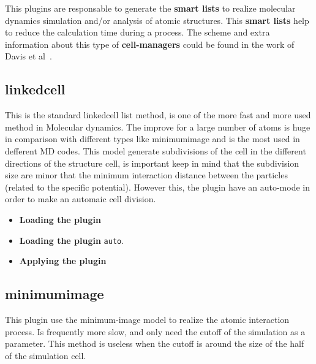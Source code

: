 This plugins are responsable to generate the \textbf{smart lists} to realize
molecular dynamics simulation and/or analysis of atomic structures. This
\textbf{smart lists} help to reduce the calculation time during a process. The
scheme and extra information about this type of \textbf{cell-managers} could be
found in the work of Davis et al~\cite{Davis2010}.

\subsection{linkedcell}
This is the standard linkedcell list method, is one of the more fast and more
used method in Molecular dynamics. The improve for a large number of atoms is
huge in comparison with different types like minimumimage and is the most used
in defferent MD codes. This model generate subdivisions of the cell in the
different directions of the structure cell, is important keep in mind that the
subdivision size are minor that the minimum interaction distance between the
particles (related to the specific potential). However this, the plugin have an
auto-mode in order to make an automaic cell division.

\begin{itemize}
 \item \textbf{Loading the plugin}
 \item \textbf{Loading the plugin} \texttt{auto}.
 \item \textbf{Applying the plugin}
\end{itemize}

\subsection{minimumimage}
This plugin use the minimum-image model to realize the atomic interaction
process. Is frequently more slow, and only need the cutoff of the simulation as
a parameter. This method is useless when the cutoff is around the size of the
half of the simulation cell.


